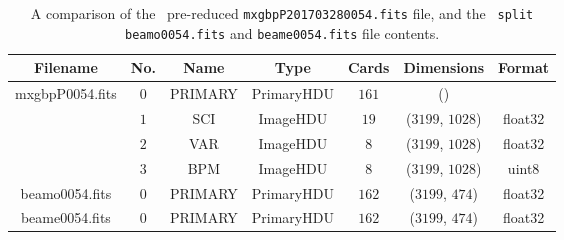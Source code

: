 \newcommand\mc[1]{\multicolumn{1}{c|}{#1}} %

\begin{table}[t]
    \centering
    \begin{tabular}{ccccccc}
        \hline
        Filename            & No. & Name    & Type       & Cards & Dimensions   & Format  \\ \hline
        \mc{\multirow{4}{*}{\parbox[c]{1.8cm}{mxgbpP\-0054.fits}}}
                            & $0$   & PRIMARY & Primary\gls{HDU} & $161$   & ()           &  \\
        \mc{}               & $1$   & SCI     & Image\gls{HDU}   & $19$    & ($3199$, $1028$) & float32 \\
        \mc{}               & $2$   & VAR     & Image\gls{HDU}   & $8$     & ($3199$, $1028$) & float32 \\
        \mc{}               & $3$   & BPM     & Image\gls{HDU}   & $8$     & ($3199$, $1028$) & uint8   \\
        \mc{beamo0054.fits} & $0$   & PRIMARY & Primary\gls{HDU} & $162$   & ($3199$, $474$)  & float32 \\
        \mc{beame0054.fits} & $0$   & PRIMARY & Primary\gls{HDU} & $162$   & ($3199$, $474$)  & float32 \\ \hline
    \end{tabular}
    \caption{A comparison of the \polsalt\ pre-reduced \texttt{mxgbpP201703280054.fits} file, and the \stops\ \texttt{split} \texttt{beamo0054.fits} and \texttt{beame0054.fits} file contents.}
    \label{table:split_info}
\end{table}
